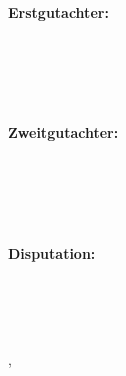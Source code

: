 \begin{minipage}[t]{.27\textwidth}
	\raggedleft
	\textbf{Erstgutachter:}
\end{minipage}
\hspace*{25pt}
\begin{minipage}[t]{.40\textwidth}
	{\Large \thesisFirstReviewer} \\
	{\small \thesisFirstReviewerUniversity} \\[-1mm]
	{\small \thesisFirstReviewerCity}
\end{minipage} \\[5mm]
\begin{minipage}[t]{.27\textwidth}
	\raggedleft
	\textbf{Zweitgutachter:}
\end{minipage}
\hspace*{25pt}
\begin{minipage}[t]{.40\textwidth}
	{\Large \thesisSecondReviewer} \\
	{\small \thesisSecondReviewerUniversity} \\[-1mm]
	{\small \thesisSecondReviewerCity}
\end{minipage} \\[10mm]
\begin{minipage}[t]{.27\textwidth}
	\raggedleft
	\textbf{}
	\textbf{Disputation:}
\end{minipage}
\hspace*{25pt}
\begin{minipage}[t]{.40\textwidth}
	\thesisDefense %
\end{minipage} \\[10mm]


\vfill
{
	\small
	\textbf{\thesisDegree\ \thesisName} \\
	\textit{\thesisTitle} \\
	\thesisSubject, \thesisDate \\[1.0em]
	\textbf{\thesisOrganization} \\
	\thesisOrganizationDepartment \\
	\textit{\thesisOrganizationGroup} \\
	\thesisOrganizationStreetAddress \\
	\thesisOrganizationPostalCode\ \thesisOrganizationCity \\[1.0em]
	\textbf{\thesisUniversity} \\
	\thesisUniversityDepartment \\
	\thesisUniversityInstitute \\
	\textit{\thesisUniversityGroup} \\
	\thesisUniversityStreetAddress \\
	\thesisUniversityPostalCode\ \thesisUniversityCity

}
